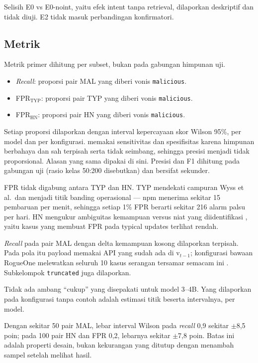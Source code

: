 \documentclass[a4paper,fleqn]{cas-dc}
\begin{document}
Selisih E0 vs E0-noint, yaitu efek intent tanpa retrieval, dilaporkan
deskriptif dan tidak diuji. E2 tidak masuk perbandingan konfirmatori.

\subsection{Metrik}\label{sec:metrics}

Metrik primer dihitung per subset, bukan pada gabungan himpunan uji.

\begin{itemize}
\item \emph{Recall}: proporsi pair MAL yang diberi vonis \texttt{malicious}.
\item FPR$_{\mathrm{TYP}}$: proporsi pair TYP yang diberi vonis \texttt{malicious}.
\item FPR$_{\mathrm{HN}}$: proporsi pair HN yang diberi vonis \texttt{malicious}.
\end{itemize}

Setiap proporsi dilaporkan dengan interval kepercayaan skor Wilson 95\%, per
model dan per konfigurasi. \citet{wyss2025evaluating} memakai sensitivitas dan
spesifisitas karena himpunan berbahaya dan sah terpisah serta tidak seimbang,
sehingga presisi menjadi tidak proporsional. Alasan yang sama dipakai di sini.
Presisi dan F1 dihitung pada gabungan uji (rasio kelas 50:200 disebutkan) dan
bersifat sekunder.

FPR tidak digabung antara TYP dan HN. TYP mendekati campuran Wyss et al.\ dan
menjadi titik banding operasional --- npm menerima sekitar 15 pembaruan per
menit, sehingga setiap 1\% FPR berarti sekitar 216 alarm palsu per hari.
HN mengukur ambiguitas kemampuan versus niat yang diidentifikasi
\citet{guo2026effective}, yaitu kasus yang membuat FPR pada typical updates
terlihat rendah.

\emph{Recall} pada pair MAL dengan delta kemampuan kosong dilaporkan terpisah.
Pada pola itu payload memakai API yang sudah ada di $\mathrm{v}_{t-1}$;
konfigurasi bawaan RogueOne melewatkan seluruh 10 kasus serangan tersamar
semacam ini \citep{sofaer2024rogueone}. Subkelompok \texttt{truncated} juga
dilaporkan.

Tidak ada ambang ``cukup'' yang disepakati untuk model 3--4B. Yang dilaporkan
pada konfigurasi tanpa contoh adalah estimasi titik beserta intervalnya, per
model.

Dengan sekitar 50 pair MAL, lebar interval Wilson pada \emph{recall} 0,9
sekitar $\pm$8,5 poin; pada 100 pair HN dan FPR 0,2, lebarnya sekitar
$\pm$7,8 poin. Batas ini adalah properti desain, bukan kekurangan yang ditutup
dengan menambah sampel setelah melihat hasil.
\end{document}
